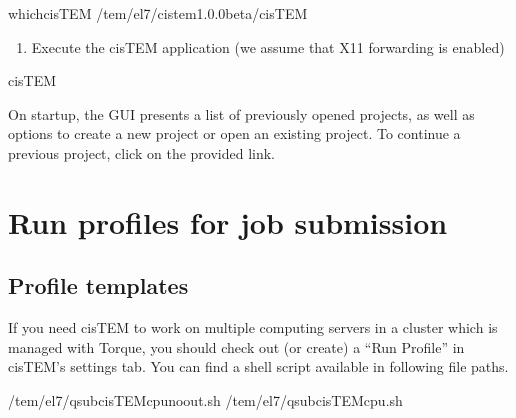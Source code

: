 \documentclass[a4paper,10pt,english]{sphinxmanual}
\begin{document}
\begin{sphinxVerbatim}[commandchars=\\\{\}]
\PYGZdl{}\PYGZgt{}whichcisTEM
/tem/el7/cistem\PYGZhy{}1.0.0\PYGZhy{}beta/cisTEM
\end{sphinxVerbatim}
\begin{enumerate}
%
\setcounter{enumi}{4}
\item {} 
\sphinxAtStartPar
Execute the cisTEM application (we assume that X11 forwarding is enabled)

\end{enumerate}

\begin{sphinxVerbatim}[commandchars=\\\{\}]
\PYGZdl{}\PYGZgt{}cisTEM
\end{sphinxVerbatim}


\sphinxAtStartPar
On startup, the GUI presents a list of previously opened projects, as well as options to create a new project or open an existing project.
To continue a previous project, click on the provided link.


\section{Run profiles for job submission}
\label{\detokenize{cisTEM:run-profiles-for-job-submission}}

\subsection{Profile templates}
\label{\detokenize{cisTEM:profile-templates}}
\sphinxAtStartPar
If you need cisTEM to work on multiple computing servers in a cluster which is managed with Torque, you should check out (or create) a “Run Profile” in cisTEM’s settings tab.
You can find a shell script available in following file paths.

\begin{sphinxVerbatim}[commandchars=\\\{\}]
/tem/el7/qsub\PYGZhy{}cisTEM\PYGZhy{}cpu\PYGZhy{}noout.sh
/tem/el7/qsub\PYGZhy{}cisTEM\PYGZhy{}cpu.sh
\end{sphinxVerbatim}
\end{document}
